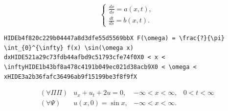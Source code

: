 \documentclass[
  ukrainian,
]{article}
\begin{document}
\[
\begin{cases} \frac{dx}{ds} = a(x, t), \\ \frac{dt}{ds} = b(x, t). \end{cases}
\]

\begin{verbatim}
HIDEb4f820c229b04447a8d3dfe55d5569bbX F(\omega) = \frac{?}{\pi} \int_{0}^{\infty} f(x) \sin(\omega x) dxHIDE521a29c73fdb44afbd9c51793cfe74f0X0 < x < \inftyHIDE1b43bf8a478c4191b049ec021d38acb9X0 < \omega < xHIDE3a2b36fafc36496ab9f15199be3f8f9fX
\end{verbatim}

\[
\begin{aligned} (\forall \Pi \Pi) & u_x + u_t + 2u = 0, & -\infty < x < \infty, & 0 < t < \infty \\ (\forall \Psi) & u(x, 0) = \sin x, & -\infty < x < \infty. \end{aligned}
\]
\end{document}
